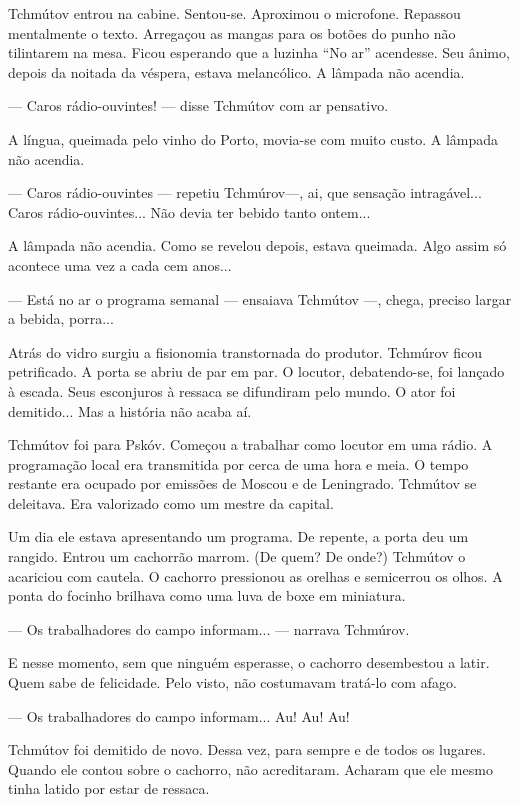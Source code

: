 Tchmútov entrou na cabine. Sentou-se. Aproximou o microfone. Repassou
mentalmente o texto. Arregaçou as mangas para os botões do punho não
tilintarem na mesa. Ficou esperando que a luzinha ``No ar'' acendesse.
Seu ânimo, depois da noitada da véspera, estava melancólico. A lâmpada
não acendia.

--- Caros rádio-ouvintes! --- disse Tchmútov com ar pensativo.

A língua, queimada pelo vinho do Porto, movia-se com muito custo. A
lâmpada não acendia.

--- Caros rádio-ouvintes --- repetiu Tchmúrov---, ai, que sensação
intragável... Caros rádio-ouvintes... Não devia ter bebido tanto
ontem...

A lâmpada não acendia. Como se revelou depois, estava queimada. Algo
assim só acontece uma vez a cada cem anos...

--- Está no ar o programa semanal --- ensaiava Tchmútov ---, chega,
preciso largar a bebida, porra...

Atrás do vidro surgiu a fisionomia transtornada do produtor. Tchmúrov
ficou petrificado. A porta se abriu de par em par. O locutor,
debatendo-se, foi lançado à escada. Seus esconjuros à ressaca se
difundiram pelo mundo. O ator foi demitido... Mas a história não acaba
aí.

Tchmútov foi para Pskóv. Começou a trabalhar como locutor em uma rádio.
A programação local era transmitida por cerca de uma hora e meia. O
tempo restante era ocupado por emissões de Moscou e de Leningrado.
Tchmútov se deleitava. Era valorizado como um mestre da capital.

Um dia ele estava apresentando um programa. De repente, a porta deu um
rangido. Entrou um cachorrão marrom. (De quem? De onde?) Tchmútov o
acariciou com cautela. O cachorro pressionou as orelhas e semicerrou os
olhos. A ponta do focinho brilhava como uma luva de boxe em miniatura.

--- Os trabalhadores do campo informam... --- narrava Tchmúrov.

E nesse momento, sem que ninguém esperasse, o cachorro desembestou a
latir. Quem sabe de felicidade. Pelo visto, não costumavam tratá-lo com
afago.

--- Os trabalhadores do campo informam... Au! Au! Au!

Tchmútov foi demitido de novo. Dessa vez, para sempre e de todos os
lugares. Quando ele contou sobre o cachorro, não acreditaram. Acharam
que ele mesmo tinha latido por estar de ressaca.

